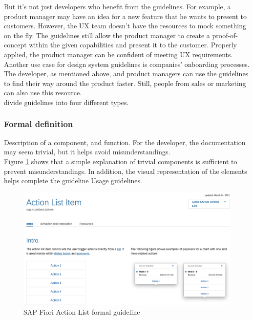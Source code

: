 But it's not just developers who benefit from the guidelines. For example, a product manager may have an idea for a new feature that he wants to present to customers. However, the UX team doesn't have the resources to mock something on the fly. The guidelines still allow the product manager to create a proof-of-concept within the given capabilities and present it to the customer. Properly applied, the product manager can be confident of meeting UX requirements.  \cite{vesselov_building_2019} \\
Another use case for design system guidelines is companies' onboarding processes. The developer, as mentioned above, and product managers can use the guidelines to find their way around the product faster. Still, people from sales or marketing can also use this resource. \cite{vesselov_building_2019} \\

\citet*{vesselov_building_2019} divide guidelines into four different types.

\subsubsection{Formal definition} 
Description of a component, and function. For the developer, the documentation may seem trivial, but it helps avoid misunderstandings. \cite{vesselov_building_2019}  \\
Figure \ref{fiori_action_list} shows that a simple explanation of trivial components is sufficient to prevent misunderstandings. In addition, the visual representation of the elements helps complete the guideline Usage guidelines.
\begin{figure}[ht]
\centerline{\includegraphics[width=\linewidth]{images/fiori_action-list_formal.png}}
\caption{SAP Fiori Action List formal guideline \cite{sap_fiori_nodate}}
\label{fiori_action_list}
\end{figure}
\newpage

